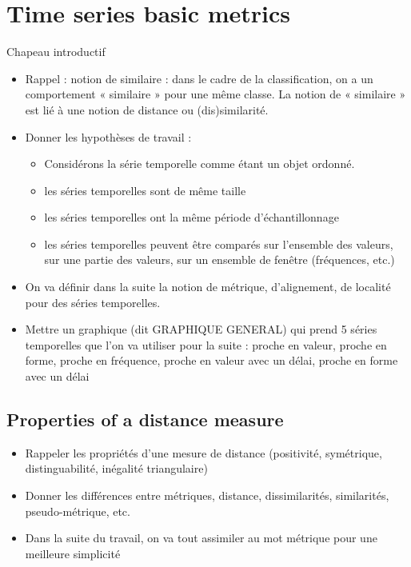 \chapter{Time series basic metrics}
\label{sec:unchapitre}
\minitoc

\noindent Chapeau introductif
\begin{itemize}
	\item Rappel : notion de similaire : dans le cadre de la classification, on a un comportement « similaire » pour une même classe. La notion de « similaire » est lié à une notion de distance ou (dis)similarité. 
	\item Donner les hypothèses de travail : 
	\begin{itemize}
		\item Considérons la série temporelle comme étant un objet ordonné.
		\item les séries temporelles sont de même taille
		\item les séries temporelles ont la même période d'échantillonnage
		\item les séries temporelles peuvent être comparés sur l'ensemble des valeurs, sur une partie des valeurs, sur un ensemble de fenêtre (fréquences, etc.)
	\end{itemize}
	\item On va définir dans la suite la notion de métrique, d'alignement, de localité pour des séries temporelles.
	\item Mettre un graphique (dit GRAPHIQUE GENERAL) qui prend 5 séries temporelles que l'on va utiliser pour la suite : proche en valeur, proche en forme, proche en fréquence, proche en valeur avec un délai, proche en forme avec un délai
\end{itemize}

\section{Properties of a distance measure}
\begin{itemize}
	\item Rappeler les propriétés d'une mesure de distance (positivité, symétrique, distinguabilité, inégalité triangulaire)
	\item Donner les différences entre métriques, distance, dissimilarités, similarités, pseudo-métrique, etc.
	\item Dans la suite du travail, on va tout assimiler au mot métrique pour une meilleure simplicité
\end{itemize}



